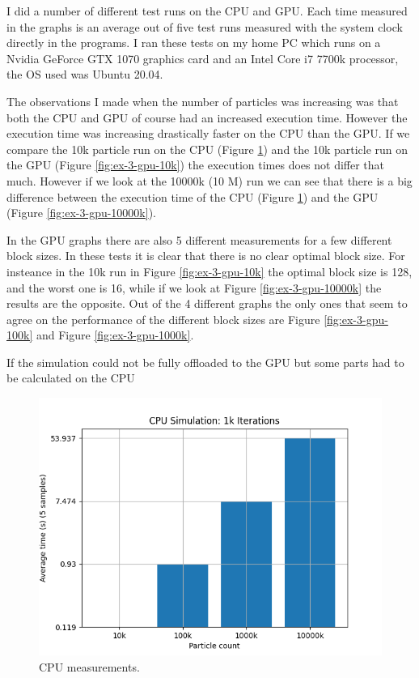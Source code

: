 \documentclass[a4paper, 12pt]{article}
\def\f#1{Figure \ref{fig:#1}}
\begin{document}
I did a number of different test runs on the CPU and GPU. Each time measured in the graphs is an average out of five test runs measured with the system clock directly in the programs. I ran these tests on my home PC which runs on a Nvidia GeForce GTX 1070 graphics card and an Intel Core i7 7700k processor, the OS used was Ubuntu 20.04.
\par The observations I made when the number of particles was increasing was that both the CPU and GPU of course had an increased execution time. However the execution time was increasing drastically faster on the CPU than the GPU. If we compare the 10k particle run on the CPU (\f{ex-3-cpu}) and the 10k particle run on the GPU (\f{ex-3-gpu-10k}) the execution times does not differ that much. However if we look at the 10000k (10 M) run we can see that there is a big difference between the execution time of the CPU (\f{ex-3-cpu}) and the GPU (\f{ex-3-gpu-10000k}).
\par In the GPU graphs there are also 5 different measurements for a few different block sizes. In these tests it is clear that there is no clear optimal block size. For insteance in the 10k run in \f{ex-3-gpu-10k} the optimal block size is 128, and the worst one is 16, while if we look at \f{ex-3-gpu-10000k} the results are the opposite. Out of the 4 different graphs the only ones that seem to agree on the performance of the different block sizes are \f{ex-3-gpu-100k} and \f{ex-3-gpu-1000k}.
\par If the simulation could not be fully offloaded to the GPU but some parts had to be calculated on the CPU
\begin{figure}
    \centering
	\includegraphics[width=0.8\linewidth]{graphs/ex_3_graph_cpu.png}
	\caption{CPU measurements.}
    \label{fig:ex-3-cpu}
\end{figure}
\end{document}
